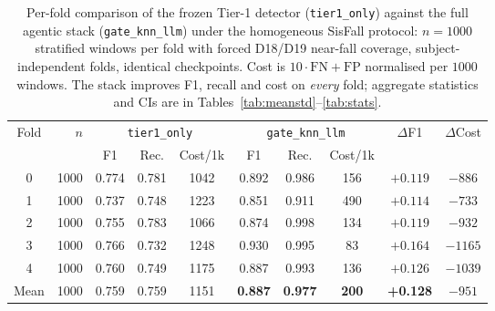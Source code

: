 \begin{table}[!t]
\centering
\caption{Per-fold comparison of the frozen Tier-1 detector (\texttt{tier1\_only}) against the full agentic stack (\texttt{gate\_knn\_llm}) under the homogeneous SisFall protocol: $n{=}1000$ stratified windows per fold with forced D18/D19 near-fall coverage, subject-independent folds, identical checkpoints. Cost is $10\cdot\mathrm{FN}{+}\mathrm{FP}$ normalised per $1000$ windows. The stack improves F1, recall and cost on \emph{every} fold; aggregate statistics and CIs are in Tables~\ref{tab:meanstd}--\ref{tab:stats}.}
\label{tab:perfold}
\begin{tabular}{c r ccc ccc cc}
\toprule
Fold & $n$ & \multicolumn{3}{c}{\texttt{tier1\_only}} & \multicolumn{3}{c}{\texttt{gate\_knn\_llm}} & $\Delta$F1 & $\Delta$Cost \\
\cmidrule(lr){3-5}\cmidrule(lr){6-8}
 & & F1 & Rec. & Cost/1k & F1 & Rec. & Cost/1k & & \\
\midrule
0 & 1000 & 0.774 & 0.781 & 1042 & 0.892 & 0.986 & 156 & $+0.119$ & $-886$  \\
1 & 1000 & 0.737 & 0.748 & 1223 & 0.851 & 0.911 & 490 & $+0.114$ & $-733$  \\
2 & 1000 & 0.755 & 0.783 & 1066 & 0.874 & 0.998 & 134 & $+0.119$ & $-932$  \\
3 & 1000 & 0.766 & 0.732 & 1248 & 0.930 & 0.995 & 83  & $+0.164$ & $-1165$ \\
4 & 1000 & 0.760 & 0.749 & 1175 & 0.887 & 0.993 & 136 & $+0.126$ & $-1039$ \\
\midrule
Mean & 1000 & 0.759 & 0.759 & 1151 & \textbf{0.887} & \textbf{0.977} & \textbf{200} & \textbf{+0.128} & $-951$ \\
\bottomrule
\end{tabular}
\end{table}
